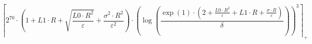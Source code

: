 \[\left\lceil 2^{70} \cdot \left(1 + L1 \cdot R + \sqrt{\frac{L0 \cdot R^{2}}{\varepsilon}} + \frac{\sigma^{2} \cdot R^{2}}{\varepsilon^{2}}\right) \cdot \left(\log\left(\frac{\exp\left(1\right) \cdot \left(2 + \frac{L0 \cdot R^{2}}{\varepsilon} + L1 \cdot R + \frac{\sigma \cdot R}{\varepsilon}\right)}{\delta}\right)\right)^{3} \right\rceil_{+}\]
